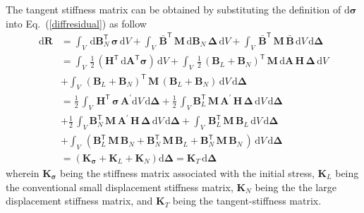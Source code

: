 The tangent stiffness matrix can be obtained by substituting the definition of $\mathrm{d} \boldsymbol{\sigma}$ into Eq.~(\ref{diffresidual}) as follow 
\begin{equation}
\begin{aligned}
\mathrm{d} \mathbf{R} & = \int_{V} \, \mathrm{d} \mathbf{B}_N^{\mathsf{T}} \, \boldsymbol{\sigma} \, \mathrm{d} V + \int_{V} \, \bar{\mathbf{B}}^{\mathsf{T}} \, \mathbf{M} \, \mathrm{d} \mathbf{B}_N \, \boldsymbol{\Delta} \, \mathrm{d} V  + \int_{V} \, \bar{\mathbf{B}}^{\mathsf{T}} \, \mathbf{M} \, \bar{\mathbf{B}} \, \mathrm{d} V \, \mathrm{d} \boldsymbol{\Delta} \\ 
& = \int_{V} \, \frac{1}{2} \, (\mathbf{H}^{\mathsf{T}} \, \mathrm{d} \mathbf{A}^{\mathsf{T}} \boldsymbol{\sigma}) \, \mathrm{d} V + \int_{V} \, \frac{1}{2} \, \left(\mathbf{B}_L + \mathbf{B}_N \right)^{\mathsf{T}} \, \mathbf{M} \, \mathrm{d} \mathbf{A} \, \mathbf{H} \, \boldsymbol{\Delta} \, \mathrm{d} V  \\
& + \int_{V} \, \left(\mathbf{B}_L + \mathbf{B}_N \right)^{\mathsf{T}} \, \mathbf{M} \,  \left(\mathbf{B}_L + \mathbf{B}_N \right) \, \mathrm{d} V \, \mathrm{d} \boldsymbol{\Delta} \\ 
& = \frac{1}{2} \, \int_{V} \, \mathbf{H}^{\mathsf{T}} \, \boldsymbol{\sigma} \, \mathbf{A}^{'} \mathrm{d} V \, \mathrm{d} \boldsymbol{\Delta} + \frac{1}{2} \, \int_{V} \mathbf{B}_L^{\mathsf{T}} \, \mathbf{M} \, \mathbf{A}^{'} \, \mathbf{H} \, \boldsymbol{\Delta} \, \mathrm{d} V \, \mathrm{d} \boldsymbol{\Delta}\\
& + \frac{1}{2} \, \int_{V} \mathbf{B}_N^{\mathsf{T}} \, \mathbf{M} \, \mathbf{A}^{'} \, \mathbf{H} \, \boldsymbol{\Delta} \, \mathrm{d} V \, \mathrm{d} \boldsymbol{\Delta} + \int_{V} \, \mathbf{B}_L^{\mathsf{T}} \, \mathbf{M} \, \mathbf{B}_L \, \mathrm{d} V \, \mathrm{d} \boldsymbol{\Delta}\\ 
& + \int_{V} \,  \left(\mathbf{B}_L^{\mathsf{T}} \, \mathbf{M} \, \mathbf{B}_N + \mathbf{B}_N^{\mathsf{T}} \, \mathbf{M} \, \mathbf{B}_L + \mathbf{B}_N^{\mathsf{T}} \, \mathbf{M} \, \mathbf{B}_N \, \right) \, \mathrm{d} V \, \mathrm{d} \boldsymbol{\Delta}\\
& = \left(\mathbf{K}_{\boldsymbol{\sigma}} + \mathbf{K}_L + \mathbf{K}_N\right)\mathrm{d} \boldsymbol{\Delta} = \mathbf{K}_T \, \mathrm{d} \boldsymbol{\Delta}
\end{aligned} 
\end{equation} 
wherein $\mathbf{K}_{\boldsymbol{\sigma}}$ being the stiffness matrix associated with the initial stress, $\mathbf{K}_L$ being the conventional small displacement stiffness matrix, $\mathbf{K}_N$ being the the large displacement stiffness matrix, and $\mathbf{K}_T$ being the tangent-stiffness matrix. 

